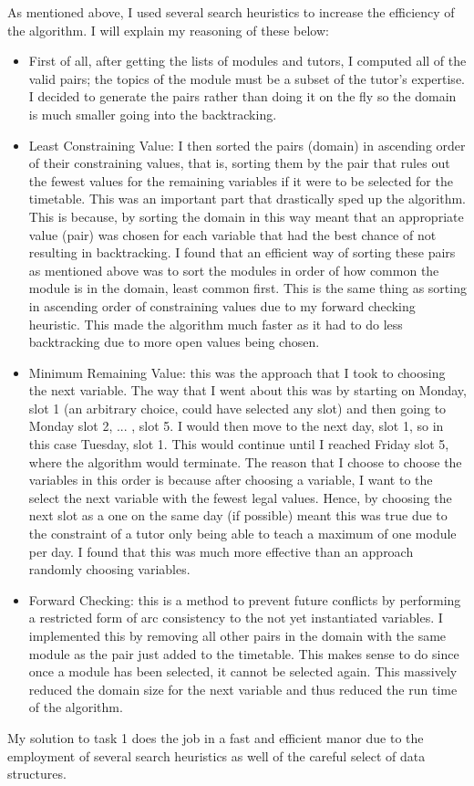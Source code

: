 \documentclass[conference]{IEEEtran}
\begin{document}
As mentioned above, I used several search heuristics to increase the efficiency of the algorithm. I will explain my reasoning of these below: 
\begin{itemize}
\item First of all, after getting the lists of modules and tutors, I computed all of the valid pairs; the topics of the module must be a subset of the tutor's expertise. I decided to generate the pairs rather than doing it on the fly so the domain is much smaller going into the backtracking.
\item Least Constraining Value: I then sorted the pairs (domain) in ascending order of their constraining values, that is, sorting them by the pair that rules out the fewest values for the remaining variables if it were to be selected for the timetable. This was an important part that drastically sped up the algorithm. This is because, by sorting the domain in this way meant that an appropriate value (pair) was chosen for each variable that had the best chance of not resulting in backtracking. I found that an efficient way of sorting these pairs as mentioned above was to sort the modules in order of how common the module is in the domain, least common first. This is the same thing as sorting in ascending order of constraining values due to my forward checking heuristic. This made the algorithm much faster as it had to do less backtracking due to more open values being chosen.
\item Minimum Remaining Value: this was the approach that I took to choosing the next variable. The way that I went about this was by starting on Monday, slot 1 (an arbitrary choice, could have selected any slot) and then going to Monday slot 2, ... , slot 5. I would then move to the next day, slot 1, so in this case Tuesday, slot 1. This would continue until I reached Friday slot 5, where the algorithm would terminate. The reason that I choose to choose the variables in this order is because after choosing a variable, I want to the select the next variable with the fewest legal values. Hence, by choosing the next slot as a one on the same day (if possible) meant this was true due to the constraint of a tutor only being able to teach a maximum of one module per day. I found that this was much more effective than an approach randomly choosing variables.
\item Forward Checking: this is a method to prevent future conflicts by performing a restricted form of arc consistency to the not yet instantiated variables. I implemented this by removing all other pairs in the domain with the same module as the pair just added to the timetable. This makes sense to do since once a module has been selected, it cannot be selected again. This massively reduced the domain size for the next variable and thus reduced the run time of the algorithm. 
\end{itemize}
My solution to task 1 does the job in a fast and efficient manor due to the employment of several search heuristics as well of the careful select of data structures.
\end{document}
